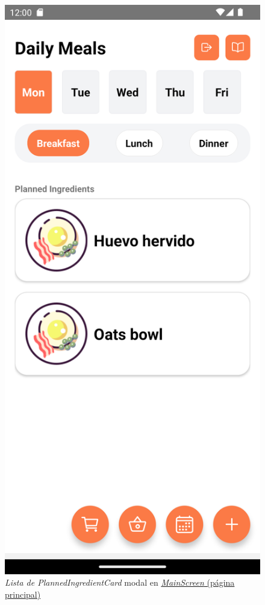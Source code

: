 \documentclass[twoside, openright, 11pt]{report}
\begin{document}
					\begin{figure}[H]
						\centering
						\includegraphics[scale=0.1]{imagenes/MainScreenScreenshot.png}
						\caption{\textit{Lista de \textit{PlannedIngredientCard}} modal en \hyperref[fig:MainScreen]{\textit{MainScreen} (página principal)}}
						\label{fig:PlannedIngredienCard}
					\end{figure}
\end{document}

